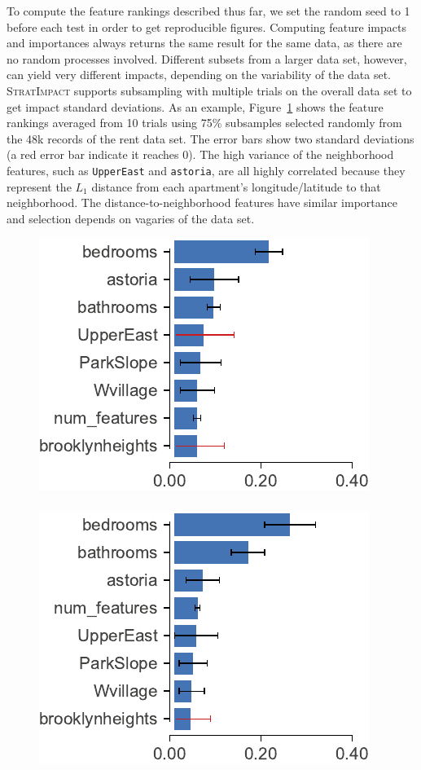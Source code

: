 \documentclass[11pt]{article}
\newcommand{\figref}[1]{Figure~\ref{#1}}
\newcommand{\simp}{\fontfamily{cmr}\textsc{\small StratImpact}}
\begin{document}
To compute the feature rankings described thus far, we set the random seed to 1 before each test in order to get reproducible figures. Computing feature impacts and importances always returns the same result for the same data, as there are no random processes involved.  Different subsets from a larger data set, however, can yield very different impacts, depending on the variability of the data set. \simp{} supports subsampling with multiple trials on the overall data set to get impact standard deviations.  As an example, \figref{fig:stability} shows the  feature rankings averaged from 10 trials using 75\% subsamples selected randomly from the 48k records of the rent data set. The error bars show two standard deviations (a red error bar indicate it reaches 0). The high variance of the neighborhood features, such as {\tt UpperEast} and {\tt astoria}, are all highly correlated because they represent the $L_1$ distance from each apartment's longitude/latitude to that neighborhood. The distance-to-neighborhood features have similar importance and selection depends on vagaries of the data set.
 
\begin{figure}[htbp]
\begin{center}
\includegraphics[scale=0.65]{images/rent-stability-importance.pdf}~~~\includegraphics[scale=0.65]{images/rent-stability-impact.pdf}
\label{fig:stability}
\end{center}
\end{figure}
\end{document}

